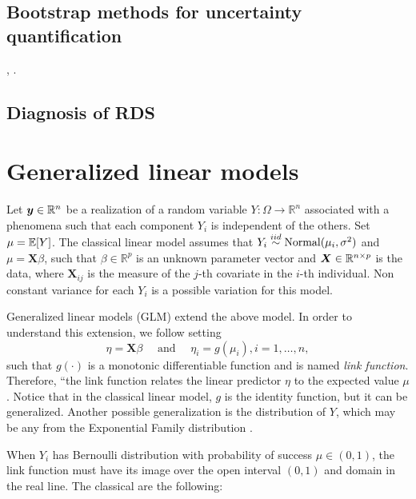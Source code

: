 \subsection{Bootstrap methods for uncertainty quantification}

\cite{baraff2016estimating}, \cite{salganik2006variance}. 

\subsection{Diagnosis of RDS}

\cite{gile2015diagnostics}

\section{Generalized linear models}
\label{sec:glm}

Let $\boldsymbol{y} \in \mathbb{R}^n$ be a realization of a random variable $Y :
\Omega \to \mathbb{R}^n$ associated with a phenomena such that each component
$Y_i$ is independent of the others. Set $\mu = \mathbb{E}[Y]$. The classical linear
model assumes that $Y_i \overset{iid}{\sim} \operatorname{Normal}(\mu_i, \sigma^2)$ and $\mu =
\boldsymbol{X}\beta$, such that $\beta \in \mathbb{R}^p$ is an unknown parameter vector and
$\boldsymbol{X} \in \mathbb{R}^{n \times p}$ is the data, where $\boldsymbol{X}_{ij}$
is the measure of the $j$-th covariate in the $i$-th individual. Non constant
variance for each $Y_i$ is a possible variation for this model. 

Generalized linear models (GLM) extend the above model. In order to understand
this extension, we follow \textcite[p. 27]{mccullagh2019generalized} setting 
\begin{equation*}
  \eta = \boldsymbol{X}\beta \quad \text{ and } \quad \eta_i = g(\mu_i), i = 1, \dots, n,
\end{equation*}
such that $g(\cdot)$ is a monotonic differentiable function and is named {\em
link function}. Therefore, ``the link function relates the linear predictor
$\eta$ to the expected value $\mu$ \cite[p. 31]{mccullagh2019generalized}.
Notice that in the classical linear model, $g$ is the identity function, but
it can be generalized. Another possible generalization is the distribution of
$Y$, which may be any from the Exponential Family distribution \cite[p.
115]{Robert2007}. 

When $Y_i$ has Bernoulli distribution with probability of success $\mu \in
(0,1)$, the link function must have its image over the open interval $(0,1)$
and domain in the real line. The classical are the following:  

